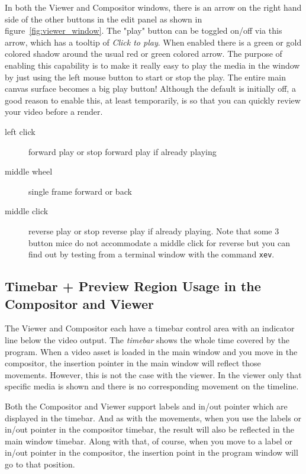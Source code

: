 In both the Viewer and Compositor windows, there is an arrow on the right hand side of the other
buttons in the edit panel as shown in figure~\ref{fig:viewer_window}.  The "play" button can be
toggled on/off via this arrow, which has a tooltip of \textit{Click to play}.  When enabled there
is a green or gold colored shadow around the usual red or green colored arrow.
The purpose of enabling this capability is to make it really easy to play the media in the window
by just using the left mouse button to start or stop the play.  The entire main canvas surface
becomes a big play button!  Although the default is initially off, a good reason to enable this,
at least temporarily, is so that you can quickly review your video before a render.
 
\begin{description}
    \item[left click]  forward play or stop forward play if already playing
    \item[middle wheel]  single frame forward or back
    \item[middle click]  reverse play or stop reverse play if already playing. 
        Note that some 3 button mice do not accommodate a middle click for reverse but you can find out by testing from a terminal window with the command \texttt{xev}.
\end{description}

\subsection{Timebar + Preview Region Usage in the Compositor and Viewer}%
\label{sub:timebar_preview_region_usage_in_the_compositor_and_viewer}

The Viewer and Compositor each have a timebar control area with an indicator line below the video
output. The \textit{timebar} shows the whole time covered by the program. When a video asset
is loaded in the main window and you move in the compositor, the insertion pointer in the main
window will reflect those movements.  However, this is not the case with the viewer.  In the viewer
only that specific media is shown and there is no corresponding movement on the timeline.

Both the Compositor and Viewer support labels and in/out pointer which are displayed in the timebar.
And as with the movements, when you use the labels or in/out pointer in the compositor timebar,
the result will also be reflected in the main window timebar.  Along with that, of course, when
you move to a label or in/out pointer in the compositor, the insertion point in the program window
will go to that position.

